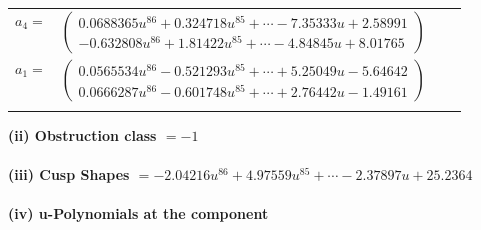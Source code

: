 \documentclass[1p]{elsarticle_modified}
\theoremstyle{definition}
\begin{document}
\begin{tabular}{m{7pt} m{180pt} m{7pt} m{180pt} }
\flushright $a_{4}=$&$\begin{pmatrix}0.0688365 u^{86}+0.324718 u^{85}+\cdots-7.35333 u+2.58991\\-0.632808 u^{86}+1.81422 u^{85}+\cdots-4.84845 u+8.01765\end{pmatrix}$ \\
\flushright $a_{1}=$&$\begin{pmatrix}0.0565534 u^{86}-0.521293 u^{85}+\cdots+5.25049 u-5.64642\\0.0666287 u^{86}-0.601748 u^{85}+\cdots+2.76442 u-1.49161\end{pmatrix}$\\&\end{tabular}
\flushleft \textbf{(ii) Obstruction class $= -1$}\\~\\
\flushleft \textbf{(iii) Cusp Shapes $= -2.04216 u^{86}+4.97559 u^{85}+\cdots-2.37897 u+25.2364$}\\~\\
\newpage\renewcommand{\arraystretch}{1}
\flushleft \textbf{(iv) u-Polynomials at the component}\newline \\
\end{document}
